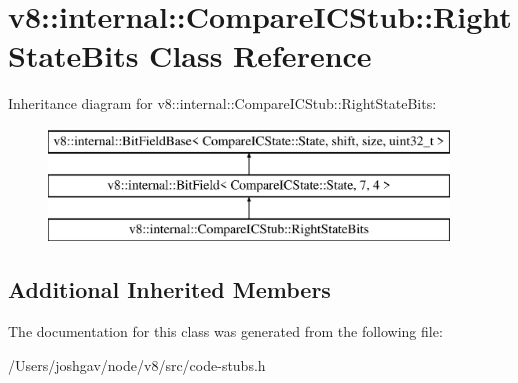 \hypertarget{classv8_1_1internal_1_1_compare_i_c_stub_1_1_right_state_bits}{}\section{v8\+:\+:internal\+:\+:Compare\+I\+C\+Stub\+:\+:Right\+State\+Bits Class Reference}
\label{classv8_1_1internal_1_1_compare_i_c_stub_1_1_right_state_bits}
Inheritance diagram for v8\+:\+:internal\+:\+:Compare\+I\+C\+Stub\+:\+:Right\+State\+Bits\+:\begin{figure}[H]
\begin{center}
\leavevmode
\includegraphics[height=3.000000cm]{classv8_1_1internal_1_1_compare_i_c_stub_1_1_right_state_bits}
\end{center}
\end{figure}
\subsection*{Additional Inherited Members}


The documentation for this class was generated from the following file\+:\begin{DoxyCompactItemize}
\item 
/\+Users/joshgav/node/v8/src/code-\/stubs.\+h\end{DoxyCompactItemize}
